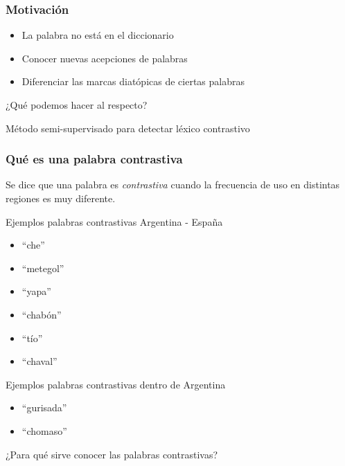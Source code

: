 
\begin{frame}[c]\frametitle{Motivación}
\begin{itemize}
  \item La palabra no está en el diccionario
  \item Conocer nuevas acepciones de palabras 
  \item Diferenciar las marcas diatópicas de ciertas palabras    
\end{itemize}
  
  ¿Qué podemos hacer al respecto?\pause

  \alert{
  Método semi-supervisado para detectar léxico contrastivo
  }

\end{frame}

\begin{frame}[t]\frametitle{Qué es una palabra contrastiva}
    
    Se dice que una palabra es \textit{contrastiva} cuando la frecuencia de uso en distintas regiones es muy diferente. 

    \begin{block}{Ejemplos palabras contrastivas Argentina - España}
    
    \begin{multicols}{3}
    \begin{itemize}
      \item ``che''
      \item ``metegol''
      \item ``yapa''
      \item ``chabón''
      \item ``tío''
       \item ``chaval''
    \end{itemize}
  \end{multicols}

    \end{block}

    \begin{block}{Ejemplos palabras contrastivas dentro de Argentina}
     \begin{multicols}{2}
    \begin{itemize}
      \item ``gurisada''
      \item ``chomaso''
    \end{itemize}
  \end{multicols}

    \end{block}
    \medskip

    ¿Para qué sirve conocer las palabras contrastivas?

\end{frame}

